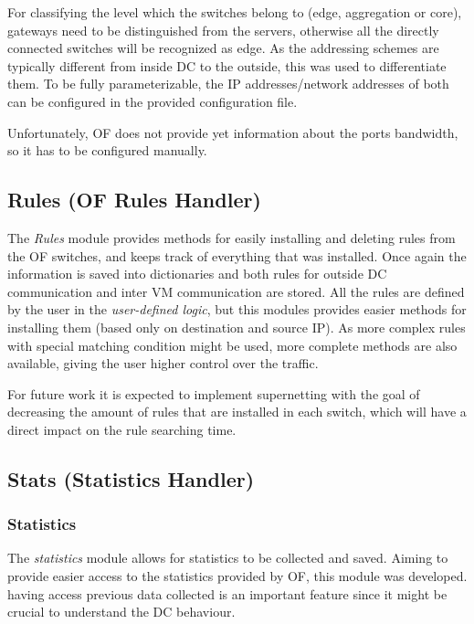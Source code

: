 \documentclass[12pt,english,oneside]{book}
\begin{document}
For classifying the level which the switches belong to (edge, aggregation or core), gateways need to be distinguished from the servers, otherwise all the directly connected switches will be recognized as edge. As the addressing schemes are typically different from inside DC to the outside, this was used to differentiate them. To be fully parameterizable, the IP addresses/network addresses of both can be configured in the provided configuration file.

Unfortunately, OF does not provide yet information about the ports bandwidth, so it has to be configured manually.
\subsection{Rules (OF Rules Handler)}
\hspace{0.6cm}

The \textit{Rules} module provides methods for easily installing and deleting rules from the OF switches, and keeps track of everything that was installed.
Once again the information is saved into dictionaries and both rules for outside DC communication and inter VM communication are stored.
All the rules are defined by the user in the \textit{user-defined logic}, but this modules provides easier methods for installing them (based only on destination and source IP). As more complex rules with special matching condition might be used, more complete methods are also available, giving the user higher control over the traffic.

For future work it is expected to implement supernetting with the goal of decreasing the amount of rules that are installed in each switch, which will have a direct impact on the rule searching time.

\newpage
\subsection{Stats (Statistics Handler)}

\subsubsection{Statistics}
\hspace{0.6cm}

The \textit{statistics} module allows for statistics to be collected and saved.
Aiming to provide easier access to the statistics provided by OF, this module was developed.
having access previous data collected is an important feature since it might be crucial to understand the DC behaviour.
\end{document}
